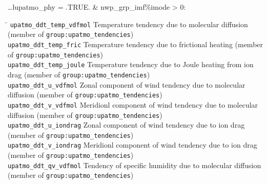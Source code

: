 \ldots lupatmo\_phy = .TRUE. \& nwp\_grp\_imf\%imode > 0:
\begin{tabbing}
\hspace*{0.4\textwidth} \= \kill
\texttt{upatmo\_ddt\_temp\_vdfmol}   \> Temperature tendency due to 
molecular diffusion (member of \texttt{group:upatmo\_tendencies}) \\
\texttt{upatmo\_ddt\_temp\_fric}   \> Temperature tendency due to 
frictional heating (member of \texttt{group:upatmo\_tendencies}) \\
\texttt{upatmo\_ddt\_temp\_joule}   \> Temperature tendency due to 
Joule heating from ion drag (member of \texttt{group:upatmo\_tendencies}) \\
\texttt{upatmo\_ddt\_u\_vdfmol}   \> Zonal component of wind tendency due to 
molecular diffusion (member of \texttt{group:upatmo\_tendencies}) \\
\texttt{upatmo\_ddt\_v\_vdfmol}   \> Meridionl component of wind tendency due to 
molecular diffusion (member of \texttt{group:upatmo\_tendencies}) \\
\texttt{upatmo\_ddt\_u\_iondrag}   \> Zonal component of wind tendency due to 
ion drag (member of \texttt{group:upatmo\_tendencies}) \\
\texttt{upatmo\_ddt\_v\_iondrag}   \> Meridionl component of wind tendency due to 
ion drag (member of \texttt{group:upatmo\_tendencies}) \\
\texttt{upatmo\_ddt\_qv\_vdfmol}   \> Tendency of specific humidity due to 
molecular diffusion (member of \texttt{group:upatmo\_tendencies}) \\
\end{tabbing}

\newpage

%

%
%

